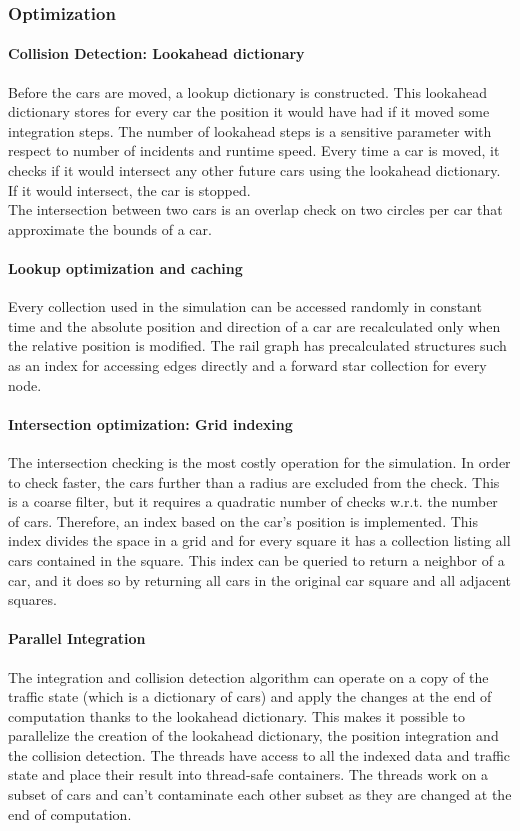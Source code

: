 \documentclass[12pt]{article}
\begin{document}
\subsubsection{Optimization}
\paragraph{Collision Detection: Lookahead dictionary}
Before the cars are moved, a lookup dictionary is constructed. This lookahead dictionary stores for every car the position it would have had if it moved some integration steps. The number of lookahead steps is a sensitive parameter with respect to number of incidents and runtime speed. Every time a car is moved, it checks if it would intersect any other future cars using the lookahead dictionary. If it would intersect, the car is stopped. \\
The intersection between two cars is an overlap check on two circles per car that approximate the bounds of a car.

\paragraph{Lookup optimization and caching}
Every collection used in the simulation can be accessed randomly in constant time and the absolute position and direction of a car are recalculated only when the relative position is modified. The rail graph has precalculated structures such as an index for accessing edges directly and a forward star collection for every node.

\paragraph{Intersection optimization: Grid indexing}
The intersection checking is the most costly operation for the simulation. In order to check faster, the cars further than a radius are excluded from the check. This is a coarse filter, but it requires a quadratic number of checks w.r.t. the number of cars. Therefore, an index based on the car's position is implemented. This index divides the space in a grid and for every square it has a collection listing all cars contained in the square. This index can be queried to return a neighbor of a car, and it does so by returning all cars in the original car square and all adjacent squares. 

\paragraph{Parallel Integration}
The integration and collision detection algorithm can operate on a copy of the traffic state (which is a dictionary of cars) and apply the changes at the end of computation thanks to the lookahead dictionary. This makes it possible to parallelize the creation of the lookahead dictionary, the position integration and the collision detection. The threads have access to all the indexed data and traffic state and place their result into thread-safe containers. The threads work on a subset of cars and can't contaminate each other subset as they are changed at the end of computation.
\end{document}
